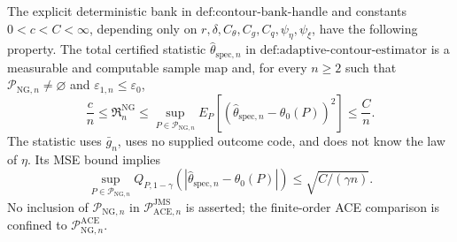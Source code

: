 The explicit deterministic bank in \(\text{def:contour-bank-handle}\) and constants \(0<c<C<\infty\), depending only on \(r,\delta,C_{\theta},C_g,C_q,\psi_{\eta},\psi_{\xi}\), have the following property.  The total certified statistic \(\widehat\theta_{\mathrm{spec},n}\) in \(\text{def:adaptive-contour-estimator}\) is a measurable and computable sample map and, for every \(n\ge2\) such that \(\mathcal P_{\mathrm{NG},n}\neq\varnothing\) and \(\varepsilon_{1,n}\le\varepsilon_0\),
\[
 \frac cn\le\mathfrak R_n^{\mathrm{NG}}
 \le\sup_{P\in\mathcal P_{\mathrm{NG},n}}
 E_P[(\widehat\theta_{\mathrm{spec},n}-\theta_0(P))^2]
 \le\frac Cn.
\]
The statistic uses \(\bar g_n\), uses no supplied outcome code, and does not know the law of \(\eta\).  Its MSE bound implies
\[
 \sup_{P\in\mathcal P_{\mathrm{NG},n}}
 Q_{P,1-\gamma}(|\widehat\theta_{\mathrm{spec},n}-\theta_0(P)|)
 \le\sqrt{C/(\gamma n)}.
\]
No inclusion of \(\mathcal P_{\mathrm{NG},n}\) in \(\mathcal P_{\mathrm{ACE},n}^{\mathrm{JMS}}\) is asserted; the finite-order ACE comparison is confined to \(\mathcal P_{\mathrm{NG},n}^{\mathrm{ACE}}\).